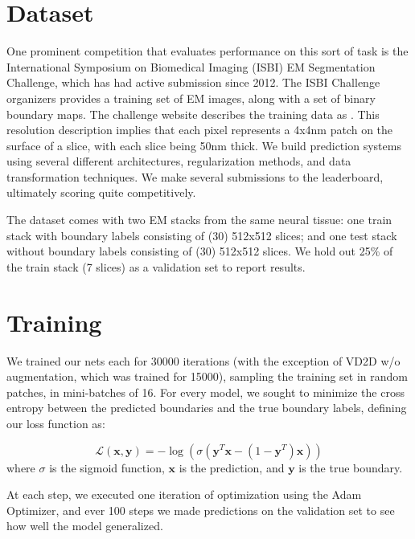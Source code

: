 \section{Dataset}

One prominent competition that evaluates performance on this sort of task is the International Symposium on Biomedical Imaging (ISBI) EM Segmentation Challenge, which has had active submission since 2012. The ISBI Challenge organizers provides a training set of EM images, along with a set of binary boundary maps. The challenge website describes the training data as \cite{Arganda-Carreras2015}. This resolution description implies that each pixel represents a 4x4nm patch on the surface of a slice, with each slice being 50nm thick. We build prediction systems using several different architectures, regularization methods, and data transformation techniques. We make several submissions to the leaderboard, ultimately scoring quite competitively.

The dataset comes with two EM stacks from the same neural tissue: one train stack with boundary labels consisting of (30) 512x512 slices; and one test stack without boundary labels consisting of (30) 512x512 slices. We hold out 25\% of the train stack (7 slices) as a validation set to report results.

\section{Training}

We trained our nets each for 30000 iterations (with the exception of VD2D w/o augmentation, which was trained for 15000), sampling the training set in random patches, in mini-batches of 16. For every model, we sought to minimize the cross entropy between the predicted boundaries and the true boundary labels, defining our loss function as:

$$\mathcal{L}(\bm{x}, \bm{y}) = -\log(\sigma(\bm{y}^{T}\bm{x}-(1-\bm{y}^{T})\bm{x}))$$
where $\sigma$ is the sigmoid function, $\bm{x}$ is the prediction, and $\bm{y}$ is the true boundary.

At each step, we executed one iteration of optimization using the Adam Optimizer, and ever 100 steps we made predictions on the validation set to see how well the model generalized.

